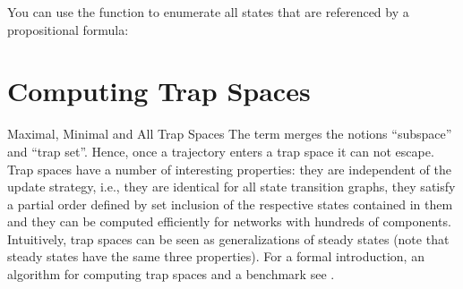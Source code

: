 \documentclass[letterpaper,10pt,english]{sphinxmanual}
\begin{document}
\begin{sphinxVerbatim}[commandchars=\\\{\}]
  \PYG{p}{[}\PYG{p}{]}
  
  
   
\end{sphinxVerbatim}

You can use the function {\hyperref[\detokenize{StateTransitionGraphs:enumerate-states}]{}} to enumerate all states that are referenced by a propositional formula:

\begin{sphinxVerbatim}[commandchars=\\\{\}]
      
\end{sphinxVerbatim}


\section{Computing Trap Spaces}
\label{\detokenize{Manual:computing-trap-spaces}}
Maximal, Minimal and All Trap Spaces
The term  merges the notions “subspace” and “trap set”.
Hence, once a trajectory enters a trap space it can not escape.
Trap spaces have a number of interesting properties: they are independent of the update strategy, i.e.,
they are identical for all state transition graphs, they satisfy a partial order defined by set inclusion of the respective states contained in them
and they can be computed efficiently for networks with hundreds of components.
Intuitively, trap spaces can be seen as generalizations of steady states (note that steady states have the same three properties).
For a formal introduction, an algorithm for computing trap spaces and a benchmark see {\hyperref[\detokenize{Bibliography:klarner2015trap}]{}}.
\end{document}
